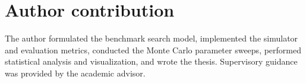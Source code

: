 \chapter{Author contribution}
The author formulated the benchmark search model, implemented the simulator and evaluation metrics, conducted the Monte Carlo parameter sweeps, performed statistical analysis and visualization, and wrote the thesis. Supervisory guidance was provided by the academic advisor.